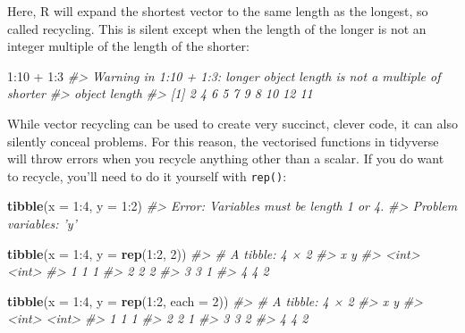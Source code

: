 \documentclass[]{book}
\newenvironment{Shaded}{\begin{snugshade}}{\end{snugshade}}
\newcommand{\KeywordTok}[1]{\textcolor[rgb]{0.13,0.29,0.53}{\textbf{{#1}}}}
\newcommand{\DataTypeTok}[1]{\textcolor[rgb]{0.13,0.29,0.53}{{#1}}}
\newcommand{\DecValTok}[1]{\textcolor[rgb]{0.00,0.00,0.81}{{#1}}}
\newcommand{\StringTok}[1]{\textcolor[rgb]{0.31,0.60,0.02}{{#1}}}
\newcommand{\CommentTok}[1]{\textcolor[rgb]{0.56,0.35,0.01}{\textit{{#1}}}}
\newcommand{\NormalTok}[1]{{#1}}
\begin{document}
Here, R will expand the shortest vector to the same length as the
longest, so called recycling. This is silent except when the length of
the longer is not an integer multiple of the length of the shorter:

\begin{Shaded}
\begin{Highlighting}[]
\DecValTok{1}\NormalTok{:}\DecValTok{10} \NormalTok{+}\StringTok{ }\DecValTok{1}\NormalTok{:}\DecValTok{3}
\CommentTok{#> Warning in 1:10 + 1:3: longer object length is not a multiple of shorter}
\CommentTok{#> object length}
\CommentTok{#>  [1]  2  4  6  5  7  9  8 10 12 11}
\end{Highlighting}
\end{Shaded}

While vector recycling can be used to create very succinct, clever code,
it can also silently conceal problems. For this reason, the vectorised
functions in tidyverse will throw errors when you recycle anything other
than a scalar. If you do want to recycle, you'll need to do it yourself
with \texttt{rep()}:

\begin{Shaded}
\begin{Highlighting}[]
\KeywordTok{tibble}\NormalTok{(}\DataTypeTok{x =} \DecValTok{1}\NormalTok{:}\DecValTok{4}\NormalTok{, }\DataTypeTok{y =} \DecValTok{1}\NormalTok{:}\DecValTok{2}\NormalTok{)}
\CommentTok{#> Error: Variables must be length 1 or 4.}
\CommentTok{#> Problem variables: 'y'}

\KeywordTok{tibble}\NormalTok{(}\DataTypeTok{x =} \DecValTok{1}\NormalTok{:}\DecValTok{4}\NormalTok{, }\DataTypeTok{y =} \KeywordTok{rep}\NormalTok{(}\DecValTok{1}\NormalTok{:}\DecValTok{2}\NormalTok{, }\DecValTok{2}\NormalTok{))}
\CommentTok{#> # A tibble: 4 × 2}
\CommentTok{#>       x     y}
\CommentTok{#>   <int> <int>}
\CommentTok{#> 1     1     1}
\CommentTok{#> 2     2     2}
\CommentTok{#> 3     3     1}
\CommentTok{#> 4     4     2}

\KeywordTok{tibble}\NormalTok{(}\DataTypeTok{x =} \DecValTok{1}\NormalTok{:}\DecValTok{4}\NormalTok{, }\DataTypeTok{y =} \KeywordTok{rep}\NormalTok{(}\DecValTok{1}\NormalTok{:}\DecValTok{2}\NormalTok{, }\DataTypeTok{each =} \DecValTok{2}\NormalTok{))}
\CommentTok{#> # A tibble: 4 × 2}
\CommentTok{#>       x     y}
\CommentTok{#>   <int> <int>}
\CommentTok{#> 1     1     1}
\CommentTok{#> 2     2     1}
\CommentTok{#> 3     3     2}
\CommentTok{#> 4     4     2}
\end{Highlighting}
\end{Shaded}
\end{document}
